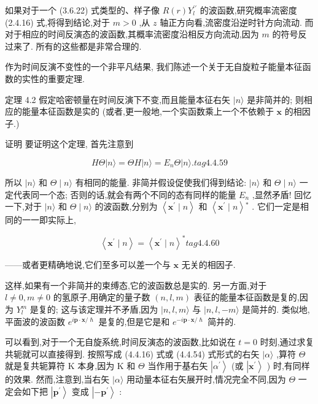 如果对于一个 (3.6.22) 式类型的、样子像 $R\left( r\right) {Y}_{l}^{\prime \prime }$ 的波函数,研究概率流密度 (2.4.16) 式,将得到结论,对于 $m > 0$ ,从 $z$ 轴正方向看,流密度沿逆时针方向流动. 而对于相应的时间反演态的波函数,其概率流密度沿相反方向流动,因为 $m$ 的符号反过来了. 所有的这些都是非常合理的.

作为时间反演不变性的一个非平凡结果, 我们陈述一个关于无自旋粒子能量本征函数的实性的重要定理.

定理 4.2 假定哈密顿量在时间反演下不变,而且能量本征右矢 $|n\rangle$ 是非简并的; 则相应的能量本征函数是实的 (或者,更一般地,一个实函数乘上一个不依赖于 $\mathbf{x}$ 的相因子.)

证明 要证明这个定理, 首先注意到

$$
{H\Theta }\left| {n\rangle = {\Theta H}}\right| n\rangle = {E}_{n}\Theta |n\rangle . tag{4. 4.59}
$$

所以 $|n\rangle$ 和 $\Theta \mid n\rangle$ 有相同的能量. 非简并假设促使我们得到结论: $|n\rangle$ 和 $\Theta \mid n\rangle$ 一定代表同一个态; 否则的话,就会有两个不同的态有同样的能量 ${E}_{n}$ ,显然矛盾! 回忆一下,对于 $|n\rangle$ 和 $\Theta \mid n\rangle$ 的波函数,分别为 $\left\langle {{\mathbf{x}}^{\prime } \mid n}\right\rangle$ 和 $\left\langle {{\mathbf{x}}^{\prime } \mid n}\right\rangle {}^{ * }$ . 它们一定是相同的一一即实际上,

$$
\left\langle {{\mathbf{x}}^{\prime } \mid n}\right\rangle = {\left\langle {\mathbf{x}}^{\prime } \mid n\right\rangle }^{ * } tag{4. 4.60}
$$

——或者更精确地说,它们至多可以差一个与 $\mathbf{x}$ 无关的相因子.

这样,如果有一个非简并的束缚态,它的波函数总是实的. 另一方面,对于 $l \neq 0, m \neq 0$ 的氢原子,用确定的量子数 $\left( {n, l, m}\right)$ 表征的能量本征函数是复的,因为 ${Y}_{l}^{m}$ 是复的; 这与该定理并不矛盾,因为 $|n, l, m\rangle$ 与 $|n, l, - m\rangle$ 是简并的. 类似地,平面波的波函数 ${e}^{i\mathbf{p} \cdot \mathbf{x}/\hslash }$ 是复的,但是它是和 ${e}^{-i\mathbf{p} \cdot \mathbf{x}/\hslash }$ 简并的.

可以看到,对于一个无自旋系统,时间反演态的波函数,比如说在 $t = 0$ 时刻,通过求复共轭就可以直接得到. 按照写成 (4.4.16) 式或 (4.4.54) 式形式的右矢 $|\alpha \rangle$ ,算符 $\Theta$ 就是复共轭算符 $\mathrm{K}$ 本身,因为 $\mathrm{K}$ 和 $\Theta$ 当作用于基右矢 $\left| {\alpha }^{\prime }\right\rangle$ (或 $\left| {\mathbf{x}}^{\prime }\right\rangle$ ) 时,有同样的效果. 然而,注意到,当右矢 $|\alpha \rangle$ 用动量本征右矢展开时,情况完全不同,因为 $\Theta$ 一定会如下把 $\left| {\mathbf{p}}^{\prime }\right\rangle$ 变成 $\left| {-{\mathbf{p}}^{\prime }}\right\rangle$ :

